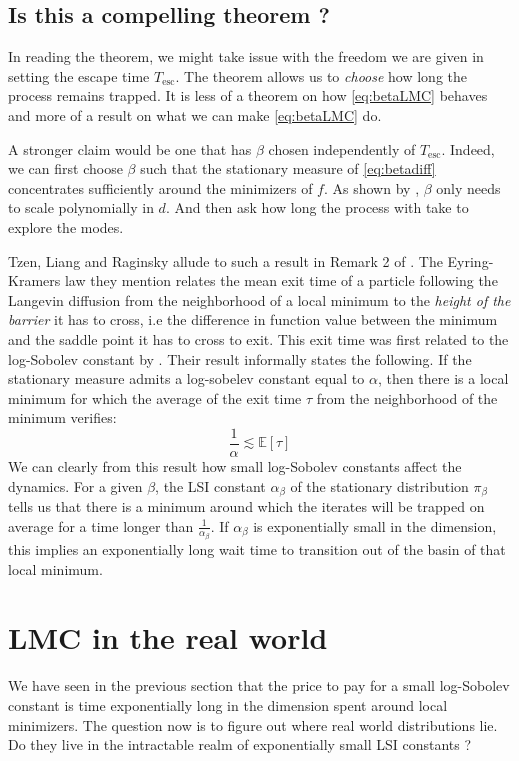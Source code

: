 \documentclass[10pt,journal,a4paper]{IEEEtran}
\theoremstyle{definition}
\newcommand{\E}{\mathbb{E}}
\begin{document}
\subsection{Is this a compelling theorem ?}

In reading the theorem, we might take issue with the freedom we are given in setting the escape time $T_{\text{esc}}$. The theorem allows us to \emph{choose} how long the process remains trapped. It is less of a theorem on how \eqref{eq:betaLMC} behaves and more of a result on what we can make \eqref{eq:betaLMC} do.

A stronger claim would be one that has $\beta$ chosen independently of $T_{\text{esc}}$. Indeed, we can first choose $\beta$ such that the stationary measure of \eqref{eq:betadiff} concentrates sufficiently around the minimizers of $f$. As shown by \cite{raginsky_non-convex_2017}, $\beta$ only needs to scale polynomially in $d$. And then ask how long the process with take to explore the modes. 

Tzen, Liang and Raginsky allude to such a result in Remark 2 of \cite{tzen_local_2018}. The Eyring-Kramers law they mention relates the mean exit time of a particle following the Langevin diffusion from the neighborhood of a local minimum to the \textit{height of the barrier} it has to cross, i.e the difference in function value between the minimum and the saddle point it has to cross to exit. This exit time was first related to the log-Sobolev constant by \cite{menz_poincare_2014-1}. Their result informally states the following. If the stationary measure admits a log-sobelev constant equal to $\alpha$, then there is a local minimum for which the average of the exit time $\tau$ from the neighborhood of the minimum verifies:
\[
    \frac{1}{\alpha} \lesssim \E[\tau]
\]
We can clearly from this result how small log-Sobolev constants affect the dynamics. For a given $\beta$, the LSI constant $\alpha_\beta$ of the stationary distribution $\pi_\beta$ tells us that there is a minimum around which the iterates will be trapped on average for a time longer than $\frac{1}{\alpha_\beta}$. If $\alpha_\beta$ is exponentially small in the dimension, this implies an exponentially long wait time to transition out of the basin of that local minimum.

\section{LMC in the real world}

We have seen in the previous section that the price to pay for a small log-Sobolev constant is time exponentially long in the dimension spent around local minimizers. The question now is to figure out where real world distributions lie. Do they live in the intractable realm of exponentially small LSI constants ?
\end{document}
